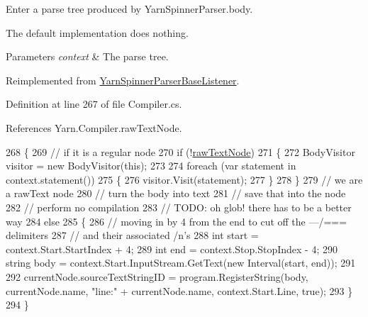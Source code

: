 Enter a parse tree produced by Yarn\-Spinner\-Parser.\-body. 

The default implementation does nothing.


\begin{DoxyParams}{Parameters}
{\em context} & The parse tree.\\
\hline
\end{DoxyParams}


Reimplemented from \hyperlink{a00173_a0bb84237855d76cd67c0214afeaece3c}{Yarn\-Spinner\-Parser\-Base\-Listener}.



Definition at line 267 of file Compiler.\-cs.



References Yarn.\-Compiler.\-raw\-Text\-Node.


\begin{DoxyCode}
268         \{
269             \textcolor{comment}{// if it is a regular node}
270             \textcolor{keywordflow}{if} (!\hyperlink{a00051_af6afc8ccb59931650919b863d62d52a4}{rawTextNode})
271             \{
272                 BodyVisitor visitor = \textcolor{keyword}{new} BodyVisitor(\textcolor{keyword}{this});
273 
274                 \textcolor{keywordflow}{foreach} (var statement \textcolor{keywordflow}{in} context.statement())
275                 \{
276                     visitor.Visit(statement);
277                 \}
278             \}
279             \textcolor{comment}{// we are a rawText node}
280             \textcolor{comment}{// turn the body into text}
281             \textcolor{comment}{// save that into the node}
282             \textcolor{comment}{// perform no compilation}
283             \textcolor{comment}{// TODO: oh glob! there has to be a better way}
284             \textcolor{keywordflow}{else}
285             \{
286                 \textcolor{comment}{// moving in by 4 from the end to cut off the ---/=== delimiters}
287                 \textcolor{comment}{// and their associated /n's}
288                 \textcolor{keywordtype}{int} start = context.Start.StartIndex + 4;
289                 \textcolor{keywordtype}{int} end = context.Stop.StopIndex - 4;
290                 \textcolor{keywordtype}{string} body = context.Start.InputStream.GetText(\textcolor{keyword}{new} Interval(start, end));
291 
292                 currentNode.sourceTextStringID = program.RegisterString(body, currentNode.name, \textcolor{stringliteral}{"line:"} + 
      currentNode.name, context.Start.Line, \textcolor{keyword}{true});
293             \}
294         \}
\end{DoxyCode}
